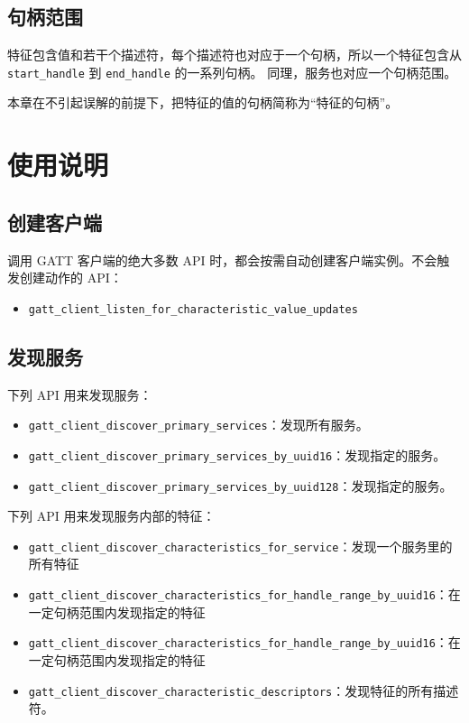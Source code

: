 \documentclass[
  12pt,
]{book}
\providecommand{\tightlist}{%
  \setlength{\itemsep}{0pt}\setlength{\parskip}{0pt}}
\begin{document}
\hypertarget{ux53e5ux67c4ux8303ux56f4}{%
\subsection{句柄范围}\label{ux53e5ux67c4ux8303ux56f4}}

特征包含值和若干个描述符，每个描述符也对应于一个句柄，所以一个特征包含从 \texttt{start\_handle} 到 \texttt{end\_handle} 的一系列句柄。
同理，服务也对应一个句柄范围。

本章在不引起误解的前提下，把特征的值的句柄简称为``特征的句柄''。

\hypertarget{ux4f7fux7528ux8bf4ux660e-4}{%
\section{使用说明}\label{ux4f7fux7528ux8bf4ux660e-4}}

\hypertarget{ux521bux5efaux5ba2ux6237ux7aef}{%
\subsection{创建客户端}\label{ux521bux5efaux5ba2ux6237ux7aef}}

调用 GATT 客户端的绝大多数 API 时，都会按需自动创建客户端实例。不会触发创建动作的 API：

\begin{itemize}
\tightlist
\item
  \texttt{gatt\_client\_listen\_for\_characteristic\_value\_updates}
\end{itemize}

\hypertarget{ux53d1ux73b0ux670dux52a1}{%
\subsection{发现服务}\label{ux53d1ux73b0ux670dux52a1}}

下列 API 用来发现服务：

\begin{itemize}
\item
  \texttt{gatt\_client\_discover\_primary\_services}：发现所有服务。
\item
  \texttt{gatt\_client\_discover\_primary\_services\_by\_uuid16}：发现指定的服务。
\item
  \texttt{gatt\_client\_discover\_primary\_services\_by\_uuid128}：发现指定的服务。
\end{itemize}

下列 API 用来发现服务内部的特征：

\begin{itemize}
\item
  \texttt{gatt\_client\_discover\_characteristics\_for\_service}：发现一个服务里的所有特征
\item
  \texttt{gatt\_client\_discover\_characteristics\_for\_handle\_range\_by\_uuid16}：在一定句柄范围内发现指定的特征
\item
  \texttt{gatt\_client\_discover\_characteristics\_for\_handle\_range\_by\_uuid16}：在一定句柄范围内发现指定的特征
\item
  \texttt{gatt\_client\_discover\_characteristic\_descriptors}：发现特征的所有描述符。
\end{itemize}
\end{document}
